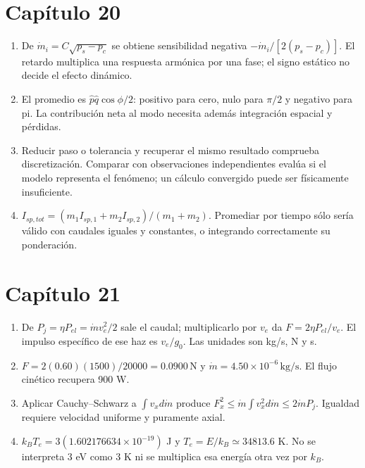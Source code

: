 \section*{Capítulo 20}
\begin{enumerate}
\item De $\dot m_i=C\sqrt{p_s-p_c}$ se obtiene sensibilidad negativa $-\dot m_i/[2(p_s-p_c)]$. El retardo multiplica una respuesta armónica por una fase; el signo estático no decide el efecto dinámico.
\item El promedio es $\widehat p\widehat q\cos\phi/2$: positivo para cero, nulo para $\pi/2$ y negativo para pi. La contribución neta al modo necesita además integración espacial y pérdidas.
\item Reducir paso o tolerancia y recuperar el mismo resultado comprueba discretización. Comparar con observaciones independientes evalúa si el modelo representa el fenómeno; un cálculo convergido puede ser físicamente insuficiente.
\item $I_{sp,tot}=(m_1I_{sp,1}+m_2I_{sp,2})/(m_1+m_2)$. Promediar por tiempo sólo sería válido con caudales iguales y constantes, o integrando correctamente su ponderación.
\end{enumerate}
\section*{Capítulo 21}
\begin{enumerate}
\item De $P_j=\eta P_{el}=\dot mv_e^2/2$ sale el caudal; multiplicarlo por $v_e$ da $F=2\eta P_{el}/v_e$. El impulso específico de ese haz es $v_e/g_0$. Las unidades son kg/s, N y s.
\item $F=2(0.60)(1500)/20000=0.0900\,\mathrm N$ y $\dot m=4.50\times10^{-6}\,\mathrm{kg/s}$. El flujo cinético recupera 900 W.
\item Aplicar Cauchy--Schwarz a $\int v_xd\dot m$ produce $F_x^2\leq\dot m\int v_x^2d\dot m\leq2\dot mP_j$. Igualdad requiere velocidad uniforme y puramente axial.
\item $k_BT_e=3(1.602176634\times10^{-19})$ J y $T_e=E/k_B\simeq34813.6$ K. No se interpreta 3 eV como 3 K ni se multiplica esa energía otra vez por $k_B$.
\end{enumerate}
